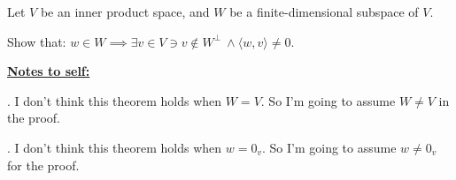 \documentclass{article}
\newenvironment{customthm}[1]
  {\renewcommand\theinnercustomthm{#1}\innercustomthm}
  {\endinnercustomthm}
\begin{document}
\begin{customthm}{20}[2021.F(3.B)]
  $ $

  Let $V$ be an inner product space, and $W$ be a finite-dimensional subspace of $V$.
  
  Show that: 
  $w \in W 
  \implies \exists v \in V 
  \ni v \not\in W^\perp \: \land 
  \langle w, v \rangle \neq 0$. 
  \newline

  
  \textbf{\underline{Notes to self:}}

  . I don't think this theorem holds when $W = V$. So I'm going to assume $W \neq V$ in the proof.
  \newline

  . I don't think this theorem holds when $w = 0_v$. So I'm going to assume $w \neq 0_v$ for the proof.
  \newline


\end{customthm}
\end{document}
